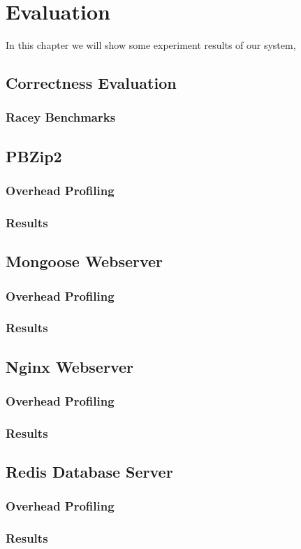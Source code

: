 \chapter{Evaluation}

In this chapter we will show some experiment results of our system, 
\section{Correctness Evaluation}
\subsection{Racey Benchmarks}
\section{PBZip2}
\subsection{Overhead Profiling}
\subsection{Results}
\section{Mongoose Webserver}
\subsection{Overhead Profiling}
\subsection{Results}
\section{Nginx Webserver}
\subsection{Overhead Profiling}
\subsection{Results}
\section{Redis Database Server}
\subsection{Overhead Profiling}
\subsection{Results}
